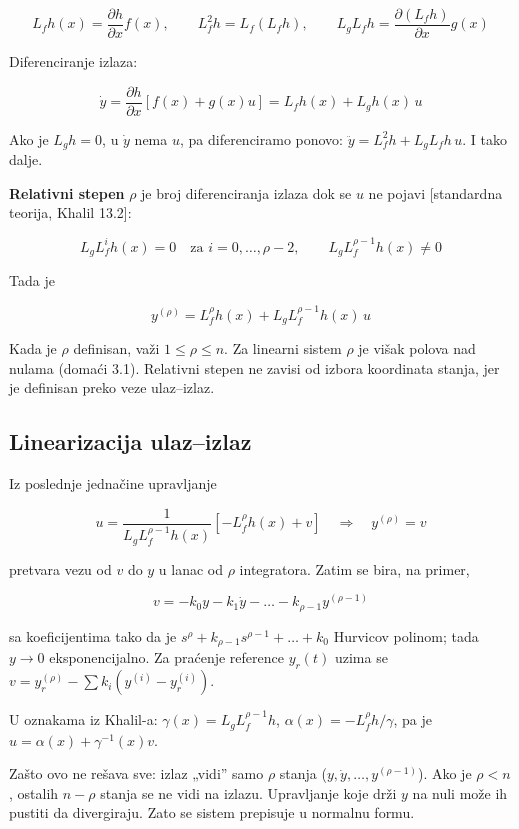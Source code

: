 \documentclass[11pt,a4paper,parskip=half,headsepline,numbers=noenddot]{scrartcl}
\DeclareRobustCommand{\izvor}[1]{{\small\color{izvorC}[#1]}}
\begin{document}
\[L_fh(x) = \frac{\partial h}{\partial x}f(x), \qquad L_f^2h = L_f(L_fh), \qquad L_gL_fh = \frac{\partial(L_fh)}{\partial x}g(x)\]

Diferenciranje izlaza:

\[\dot y = \frac{\partial h}{\partial x}\left[f(x) + g(x)u\right] = L_fh(x) + L_gh(x)\,u\]

Ako je \(L_gh = 0\), u \(\dot y\) nema \(u\), pa diferenciramo ponovo: \(\ddot y = L_f^2h + L_gL_fh\,u\). I tako dalje.

\textbf{Relativni stepen} \(\rho\) je broj diferenciranja izlaza dok se \(u\) ne pojavi \izvor{standardna teorija, Khalil 13.2}:

\[L_gL_f^{i}h(x) = 0 \quad \text{za } i = 0, \dots, \rho - 2, \qquad L_gL_f^{\rho - 1}h(x) \ne 0\]

Tada je

\[y^{(\rho)} = L_f^\rho h(x) + L_gL_f^{\rho-1}h(x)\,u\]

Kada je \(\rho\) definisan, važi \(1 \le \rho \le n\). Za linearni sistem \(\rho\) je višak polova nad nulama (domaći 3.1). Relativni stepen ne zavisi od izbora koordinata stanja, jer je definisan preko veze ulaz--izlaz.

\subsection{Linearizacija ulaz--izlaz}

Iz poslednje jednačine upravljanje

\[u = \frac{1}{L_gL_f^{\rho-1}h(x)}\left[-L_f^\rho h(x) + v\right] \quad\Rightarrow\quad y^{(\rho)} = v\]

pretvara vezu od \(v\) do \(y\) u lanac od \(\rho\) integratora. Zatim se bira, na primer,

\[v = -k_0y - k_1\dot y - \dots - k_{\rho-1}y^{(\rho-1)}\]

sa koeficijentima tako da je \(s^\rho + k_{\rho-1}s^{\rho-1} + \dots + k_0\) Hurvicov polinom; tada \(y \to 0\) eksponencijalno. Za praćenje reference \(y_r(t)\) uzima se \(v = y_r^{(\rho)} - \sum k_i(y^{(i)} - y_r^{(i)})\).

U oznakama iz Khalil-a: \(\gamma(x) = L_gL_f^{\rho-1}h\), \(\alpha(x) = -L_f^\rho h/\gamma\), pa je \(u = \alpha(x) + \gamma^{-1}(x)v\).

\begin{zasto}
Zašto ovo ne rešava sve: izlaz „vidi'' samo \(\rho\) stanja (\(y, \dot y, \dots, y^{(\rho-1)}\)). Ako je \(\rho < n\), ostalih \(n - \rho\) stanja se ne vidi na izlazu. Upravljanje koje drži \(y\) na nuli može ih pustiti da divergiraju. Zato se sistem prepisuje u normalnu formu.
\end{zasto}
\end{document}
